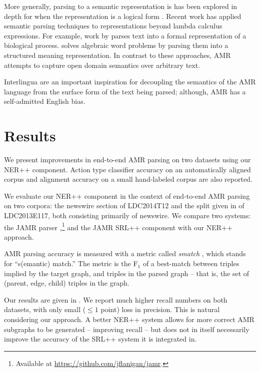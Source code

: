 \documentclass[11pt]{article}
\newcommand\w[1]{\textit{#1}} %
\begin{document}
More generally, parsing to a semantic representation is has been explored in
  depth for when the representation is a logical form
  \cite{2005kate-semantics,2005zettlemoyer-semantics,2011liang-semantics}.
Recent work has applied semantic parsing techniques to representations beyond
  lambda calculus expressions.
For example, work by  parses
  text into a formal representation of a biological process.
 solves algebraic word problems by parsing them
  into a structured meaning representation.
In contrast to these approaches, AMR attempts to capture open domain semantics
  over arbitrary text.

Interlingua
  \cite{1991mitamura-interlingua,1999carbonell-interlingua,1998levin-interlingua}
  are an important inspiration for decoupling the semantics of the AMR language
  from the surface form of the text being parsed; although, AMR has a self-admitted
  English bias.

\section{Results}
We present improvements in end-to-end AMR parsing on two datasets  using our NER++ component.
Action type classifier accuracy on an automatically aligned corpus
and alignment accuracy on a small hand-labeled corpus are also reported.

We evaluate our NER++ component in the context of end-to-end AMR parsing
on two corpora: the newswire section of LDC2014T12 and the split given in  of LDC2013E117, both consisting primarily of newswire.
We compare two systems: the JAMR parser \cite{2014flanigan-amr},\footnote{Available at \url{https://github.com/jflanigan/jamr}.}
  and the JAMR SRL++ component with our NER++ approach.

AMR parsing accuracy is measured with a metric called \w{smatch} \cite{cai2013smatch-amr}, which stands 
  for ``s(emantic) match.'' 
The metric is the F$_1$ of a best-match between triples implied by the target graph, 
  and triples in the parsed graph -- that is, the set of (parent, edge, child) triples
  in the graph.


Our results are given in .
We report much higher recall numbers on both datasets, with only small ($\leq 1$ point) 
  loss in precision.
This is natural considering our approach.
A better NER++ system allows for more correct AMR subgraphs to be generated --
  improving recall -- but does not in itself necessarily improve the accuracy of the
  SRL++ system it is integrated in.
\end{document}
